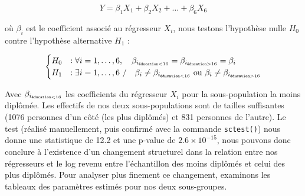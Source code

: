 \documentclass[a4paper, french, 11 pt]{article}\usepackage[]{graphicx}\usepackage[]{xcolor}
\begin{document}
\[Y = \beta_1X_1 + \beta_2X_2 + \dots + \beta_6X_6\] 

\noindent où $\beta_i$ est le coefficient associé au régresseur $X_i$, nous testons l'hypothèse nulle $H_0$ contre l'hypothèse alternative $H_1$ :

\[\begin{cases} H_0 &: \forall i=1, \dots, 6, \quad\beta_{i_{\texttt{\tiny éducation}<16}}=\beta_{i_{\texttt{\tiny éducation}>16} }= \beta_i \\ H_1 &: \exists i=1,\dots,6\ / \quad \beta_i\neq \beta_{i_{\texttt{\tiny éducation}<16}} \text{ ou } \beta_i\neq\beta_{i_{\texttt{\tiny éducation}>16} } \end{cases}\]



Avec $\beta_{i_{\texttt{\tiny éducation}<16} }$ les coefficients du régresseur $X_i$ pour la sous-population la moins diplômée. Les effectifs de nos deux sous-populations sont de tailles suffisantes (1076 personnes d'un côté (les plus diplômés) et 831 personnes de l'autre). Le test (réalisé manuellement, puis confirmé avec la commande \texttt{sctest()}) nous donne une statistique de 12.2 et une p-value de \ensuremath{2.6\times 10^{-15}}, nous pouvons donc conclure à l'existence d'un changement structurel dans la relation entre nos régresseurs et le log revenu entre l'échantillon des moins diplômés et celui des plus diplômés. Pour analyser plus finement ce changement, examinons les tableaux des paramètres estimés pour nos deux sous-groupes. 
\end{document}
